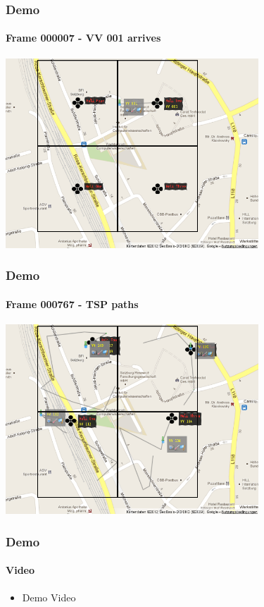 \documentclass{beamer}
\begin{document}
\begin{frame}\frametitle{Demo}\framesubtitle{Frame 000007 - VV 001 arrives}
        \begin{center}
                {\includegraphics[width=9.5cm]{out-00007-mod.png}}
        \end{center}
\end{frame}


\begin{frame}\frametitle{Demo}\framesubtitle{Frame 000767 - TSP paths}
        \begin{center}
                {\includegraphics[width=9.5cm]{out-00767-mod.png}}
        \end{center}
\end{frame}


\begin{frame}\frametitle{Demo}\framesubtitle{Video}
  \begin{itemize}
    \item Demo Video
  \end{itemize}

\end{frame}
\end{document}
